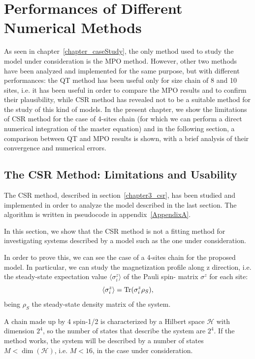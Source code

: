 \chapter{Performances of Different Numerical Methods}
\label{chapterPerformances}
As seen in chapter~\ref{chapter_caseStudy}, the only method used to study the model under consideration is the MPO method. However, other two methods have been analyzed and implemented for the same purpose, but with different performances: the QT method has been useful only for size chain of 8 and 10 sites, i.e. it has been useful in order to compare the MPO results and to confirm their plausibility, while CSR method has revealed not to be a suitable method for the study of this kind of models. In the present chapter, we show the limitations of CSR method for the case of 4-sites chain (for which we can perform a direct numerical integration of the master equation) and in the following section, a comparison between QT and MPO results is shown, with a brief analysis of their convergence and numerical errors.

\section{The CSR Method: Limitations and Usability}
The CSR method, described in section~\ref{chapter3_csr}, has been studied and implemented in order to analyze the model described in the last section. The algorithm is written in pseudocode in appendix~\ref{AppendixA}.

In this section, we show that the CSR method is not a fitting method for investigating systems described by a model such as the one under consideration.

In order to prove this, we can see the case of a 4-sites chain for the proposed model. In particular, we can study the magnetization profile along z direction, i.e. the steady-state expectation value $\langle \sigma_i^z \rangle$ of the Pauli spin- matrix $\sigma^z$ for each site:
\begin{equation*}
    \langle \sigma_i^z \rangle = \operatorname{Tr}(\sigma_i^z \rho_S),
\end{equation*}
being $\rho_S$ the steady-state density matrix of the system.

A chain made up by 4 spin-1/2 is characterized by a Hilbert space $\mathcal{H}$ with dimension $2^{4}$, so the number of states that describe the system are $2^4$. If the method works, the system will be described by a number of states $M < \dim(\mathcal{H})$, i.e. $M < 16$, in the case under consideration.

